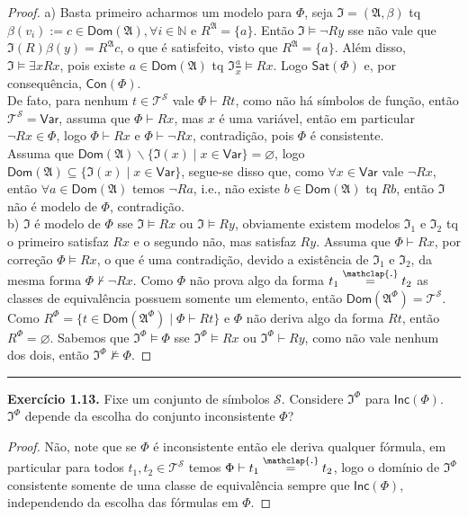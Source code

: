 \documentclass[11pt]{article}
\theoremstyle{definition}
\newcommand{\mc}[1]{\mathcal{#1}}
\newcommand{\mf}[1]{\mathfrak{#1}}
\newcommand{\msf}[1]{\mathsf{#1}}
\newcommand{\mbb}[1]{\mathbb{#1}}
\newcommand\overtext[2]{\stackrel{\mathclap{\normalfont\mbox{#1}}}{#2}}
\begin{document}
\begin{proof}
    a) Basta primeiro acharmos um modelo para $\Phi$, seja $\mf{I}=(\mf{A},\beta)$ tq $\beta(v_i):=c\in\msf{Dom}(\mf{A}),\forall i\in\mbb{N}$ e $R^\mf{A}=\{a\}$. Então $\mf{I}\vDash\neg Ry$ sse não vale que $\mf{I}(R)\beta(y)=R^\mf{A}c$, o que é satisfeito, visto que $R^\mf{A}=\{a\}$. Além disso, $\mf{I}\vDash\exists xRx$, pois existe $a\in \msf{Dom}(\mf{A})$ tq $\mf{I}\frac{a}{x}\vDash Rx$. Logo $\msf{Sat}(\Phi)$ e, por consequência, $\msf{Con}(\Phi)$.\\
    De fato, para nenhum $t\in\mc{T}^\mc{S}$ vale $\Phi\vdash Rt$, como não há símbolos de função, então $\mc{T}^\mc{S}=\msf{Var}$, assuma que $\Phi\vdash Rx$, mas $x$ é uma variável, então em particular $\neg Rx\in\Phi$, logo $\Phi\vdash Rx$ e $\Phi\vdash\neg Rx$, contradição, pois $\Phi$ é consistente.\\
    Assuma que $\msf{Dom}(\mf{A})\backslash\{\mf{I}(x)\mid x\in\msf{Var}\}=\varnothing$, logo $\msf{Dom}(\mf{A})\subseteq\{\mf{I}(x) \mid x\in\msf{Var}\}$, segue-se disso que, como $\forall x\in\msf{Var}$ vale $\neg Rx$, então $\forall a\in\msf{Dom}(\mf{A})$ temos $\neg Ra$, i.e., não existe $b\in\msf{Dom}(\mf{A})$ tq $Rb$, então $\mf{I}$ não é modelo de $\Phi$, contradição.\\
    b) $\mf{I}$ é modelo de $\Phi$ sse $\mf{I}\vDash Rx$ ou $\mf{I}\vDash Ry$, obviamente existem modelos $\mf{I}_1$ e $\mf{I}_2$ tq o primeiro satisfaz $Rx$ e o segundo não, mas satisfaz $Ry$. Assuma que $\Phi\vdash Rx$, por correção $\Phi\vDash Rx$, o que é uma contradição, devido a existência de $\mf{I}_1$ e $\mf{I}_2$, da mesma forma $\Phi\nvdash\neg Rx$. Como $\Phi$ não prova algo da forma $t_1\overtext{.}{=}t_2$ as classes de equivalência possuem somente um elemento, então $\msf{Dom}(\mf{A}^\Phi)=\mc{T}^\mc{S}$. Como $R^\Phi=\{t\in\msf{Dom}(\mf{A}^\Phi) \mid \Phi\vdash Rt\}$ e $\Phi$ não deriva algo da forma $Rt$, então $R^\Phi=\varnothing$. Sabemos que $\mf{I}^\Phi\vDash\Phi$ sse $\mf{I}^\Phi\vDash Rx$ ou $\mf{I}^\Phi\vdash Ry$, como não vale nenhum dos dois, então $\mf{I}^\Phi\nvDash\Phi$.
\end{proof}

\hrule

\textbf{Exercício 1.13.} Fixe um conjunto de símbolos $\mc{S}$. Considere $\mf{I}^\Phi$ para $\msf{Inc}(\Phi)$. $\mf{I}^\Phi$ depende da escolha do conjunto inconsistente $\Phi$?

\begin{proof}
    Não, note que se $\Phi$ é inconsistente então ele deriva qualquer fórmula, em particular para todos $t_1,t_2\in\mc{T}^\mc{S}$ temos $\Phi\vdash t_1\overtext{.}{=}t_2$, logo o domínio de $\mf{I}^\Phi$ consistente somente de uma classe de equivalência sempre que $\msf{Inc}(\Phi)$, independendo da escolha das fórmulas em $\Phi$.
\end{proof}
\end{document}

